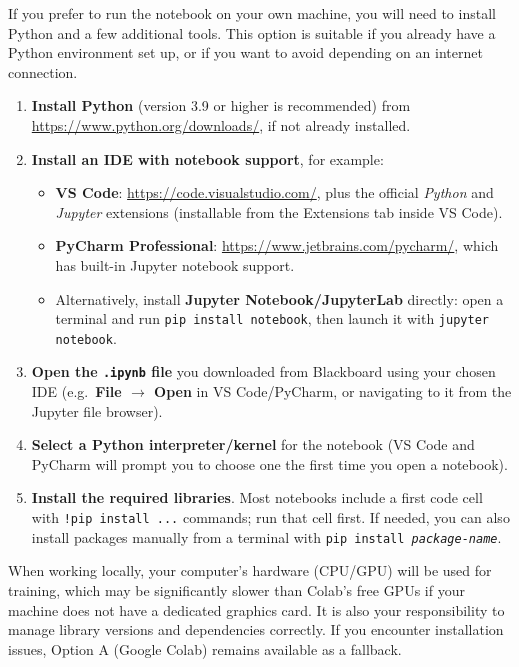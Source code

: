 \documentclass[11pt,a4paper]{article}
\begin{document}
If you prefer to run the notebook on your own machine, you will need to install Python and a few additional tools. This option is suitable if you already have a Python environment set up, or if you want to avoid depending on an internet connection.

\begin{infobox}
\begin{enumerate}
    \item \textbf{Install Python} (version 3.9 or higher is recommended) from \url{https://www.python.org/downloads/}, if not already installed.
    \item \textbf{Install an IDE with notebook support}, for example:
    \begin{itemize}
        \item \textbf{VS Code}: \url{https://code.visualstudio.com/}, plus the official \textit{Python} and \textit{Jupyter} extensions (installable from the Extensions tab inside VS Code).
        \item \textbf{PyCharm Professional}: \url{https://www.jetbrains.com/pycharm/}, which has built-in Jupyter notebook support.
        \item Alternatively, install \textbf{Jupyter Notebook/JupyterLab} directly: open a terminal and run \texttt{pip install notebook}, then launch it with \texttt{jupyter notebook}.
    \end{itemize}
    \item \textbf{Open the \texttt{.ipynb} file} you downloaded from Blackboard using your chosen IDE (e.g.\ \textbf{File $\rightarrow$ Open} in VS Code/PyCharm, or navigating to it from the Jupyter file browser).
    \item \textbf{Select a Python interpreter/kernel} for the notebook (VS Code and PyCharm will prompt you to choose one the first time you open a notebook).
    \item \textbf{Install the required libraries}. Most notebooks include a first code cell with \texttt{!pip install ...} commands; run that cell first. If needed, you can also install packages manually from a terminal with \texttt{pip install \textit{package-name}}.
\end{enumerate}
\end{infobox}

\begin{warnbox}[Important]
When working locally, your computer's hardware (CPU/GPU) will be used for training, which may be significantly slower than Colab's free GPUs if your machine does not have a dedicated graphics card. It is also your responsibility to manage library versions and dependencies correctly. If you encounter installation issues, Option A (Google Colab) remains available as a fallback.
\end{warnbox}
\end{document}
